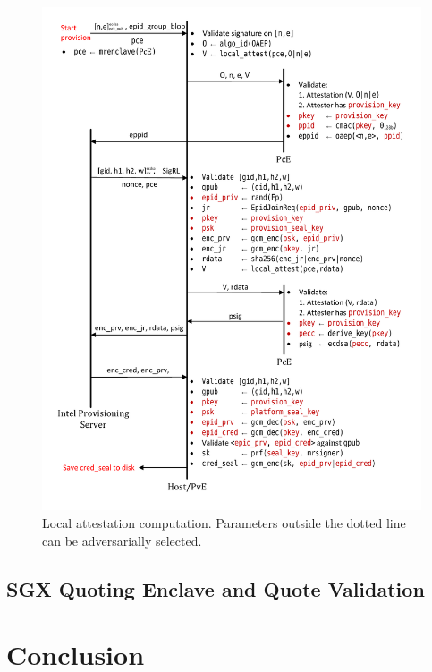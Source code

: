 \documentclass[10pt]{article}
\begin{document}
  \begin{figure}
  \centering
  \includegraphics[width=0.8\linewidth]{Diagrams/EpidProvisioning}
  \caption{Local attestation computation.
  Parameters outside the dotted line can be adversarially selected.}
  \label{fig:epidprov}
  \end{figure}

  \subsection{SGX Quoting Enclave and Quote Validation}
  \label{ssec:qe}

  \section{Conclusion}
  \label{sec:conclusion}



\end{document}
